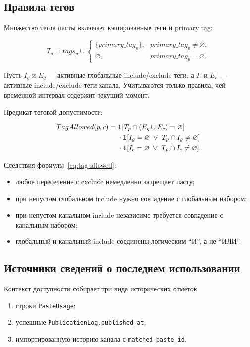 \documentclass[12pt,a4paper]{article}
\newcommand{\Ind}{\mathbf{1}}
\newcommand{\Empty}{\varnothing}
\begin{document}
\subsection{Правила тегов}

Множество тегов пасты включает кэшированные теги и primary tag:

\begin{equation}
  T_p=tags_p\cup
  \begin{cases}
    \{primary\_tag_p\},&primary\_tag_p\neq\Empty,\\
    \Empty,&primary\_tag_p=\Empty.
  \end{cases}
\end{equation}

Пусть $I_g$ и $E_g$ --- активные глобальные include/exclude-теги, а $I_c$ и
$E_c$ --- активные include/exclude-теги канала. Учитываются только правила,
чей временной интервал содержит текущий момент.

Предикат теговой допустимости:

\begin{align}
  TagAllowed(p,c)={}&
  \Ind[T_p\cap(E_g\cup E_c)=\Empty] \notag\\
  &\cdot\Ind[I_g=\Empty\ \lor\ T_p\cap I_g\neq\Empty]\notag\\
  &\cdot\Ind[I_c=\Empty\ \lor\ T_p\cap I_c\neq\Empty].
  \label{eq:tag-allowed}
\end{align}

Следствия формулы~\eqref{eq:tag-allowed}:

\begin{itemize}
  \item любое пересечение с exclude немедленно запрещает пасту;
  \item при непустом глобальном include нужно совпадение с глобальным набором;
  \item при непустом канальном include независимо требуется совпадение с
        канальным набором;
  \item глобальный и канальный include соединены логическим ``И'', а не ``ИЛИ''.
\end{itemize}

\subsection{Источники сведений о последнем использовании}

Контекст доступности собирает три вида исторических отметок:

\begin{enumerate}
  \item строки \texttt{PasteUsage};
  \item успешные \texttt{PublicationLog.published\_at};
  \item импортированную историю канала с \texttt{matched\_paste\_id}.
\end{enumerate}
\end{document}
